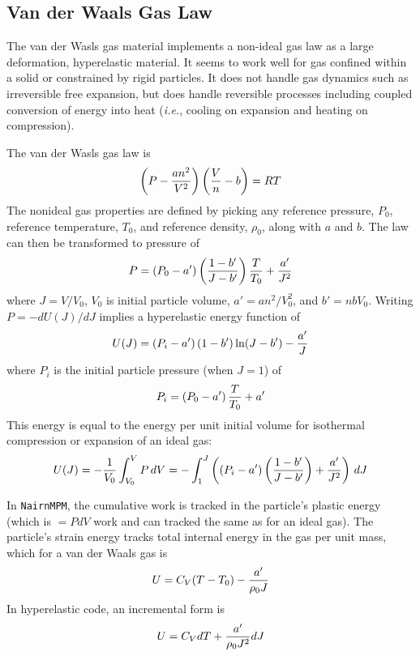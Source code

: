 \documentclass[11pt]{article}
\begin{document}
\subsection{Van der Waals Gas Law}

The van der Wasls gas material implements a non-ideal gas law as a large deformation, hyperelastic material. It seems to work well for gas confined within a solid or constrained by rigid particles. It does not handle gas dynamics such as irreversible free expansion, but does handle reversible processes including coupled conversion of energy into heat ({\em i.e.}, cooling on expansion and heating on compression).

The van der Wasls gas law is
\begin{equation}
    \left(P-{an^2\over V^2}\right)\left({V\over n}-b\right) = RT
\end{equation}
The nonideal gas properties are defined by picking any reference pressure, $P_0$, reference temperature, $T_0$, and reference density, $\rho_0$, along with $a$ and $b$. The law can then be transformed to
pressure of
\begin{equation}
    P = \left(P_0-a'\right)\left(1-b'\over J-b'\right){T\over T_0} + {a'\over J^2}
\end{equation}
where $J = V/V_0$, $V_0$ is initial particle volume, $a'=an^2/V_0^2$, and $b'=nbV_0$. Writing $P = - dU(J)/dJ$ implies a hyperelastic energy function of
\begin{equation}
    U(J) = \left(P_i-a'\right)\left(1-b'\right)\ln (J-b') - {a'\over J}
\end{equation}
where $P_i$ is the initial particle pressure (when $J=1$) of
\begin{equation}
    P_i = \left(P_0-a'\right){T\over T_0} + {a'}
\end{equation}
This energy is equal to the energy per unit initial volume for isothermal compression or expansion of an ideal gas:
\begin{equation}
    U(J) = - {1\over V_0} \int_{V_0}^V P\thinspace dV = -  \int_{1}^J \left(\left(P_i-a'\right)\left(1-b'\over J-b'\right) + {a'\over J^2}\right)\thinspace dJ
    \end{equation}

In {\tt NairnMPM}, the cumulative work is tracked in the particle's plastic energy (which is $=PdV$ work and can tracked the same as for an ideal gas). The particle's strain energy tracks total internal energy in the gas per unit mass, which for a van der Waals gas is
\begin{equation}
   U = C_V(T-T_0) - {a'\over  \rho_0 J}
\end{equation}
In hyperelastic code, an incremental form is
\begin{equation}
   U = C_V dT + {a'\over \rho_0 J^2} dJ
\end{equation}
\end{document}
